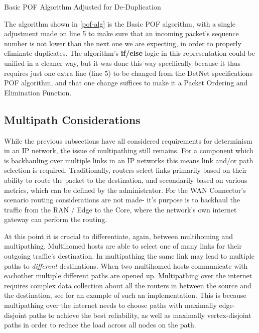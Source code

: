 \begin{algorithm}[H]
\label{pof-alg}


\caption{Basic POF Algorithm Adjusted for De-Duplication}
\end{algorithm}

The algorithm shown in \ref{pof-alg} is the Basic POF algorithm, with a single adjustment made on line 5 to make sure that an incoming packet's sequence number is not lower than the next one we are expecting, in order to properly eliminate duplicates. The algorithm's \textbf{if/else} logic in this representation could be unified in a cleaner way, but it was done this way specifically because it thus requires just one extra line (line 5) to be changed from the DetNet specifications POF algorithm, and that one change suffices to make it a Packet Ordering and Elimination Function.

\subsection{Multipath Considerations}

While the previous subsections have all considered requirements for determinism in an IP network, the issue of multipathing still remains. For a component which is backhauling over multiple links in an IP networks this means link and/or path selection is required. Traditionally, routers select links primarily based on their ability to route the packet to the destination, and secondarily based on various metrics, which can be defined by the administrator. For the WAN Connector's scenario routing considerations are not made- it's purpose is to backhaul the traffic from the RAN / Edge to the Core, where the network's own internet gateway can perform the routing.

At this point it is crucial to differentiate, again, between multihoming and multipathing. Multihomed hosts are able to select one of many links for their outgoing traffic's destination. In multipathing the same link may lead to multiple paths to \textit{different} destinations. When two multihomed hosts communicate with eachother multiple different paths are opened up. Multipathing over the internet requires complex data collection about all the routers in between the source and the destination, see \cite{ganichev2010yamr} for an example of such an implementation. This is because multipathing over the internet needs to choose paths with maximally edge-disjoint paths to achieve the best reliability, as well as maximally vertex-disjoint paths in order to reduce the load across all nodes on the path.

